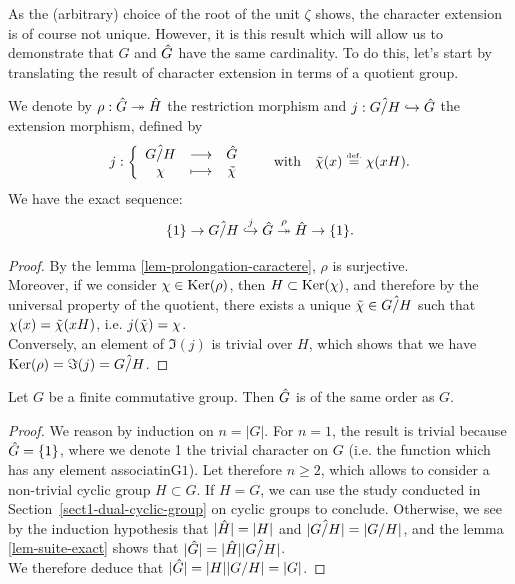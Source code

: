 As the (arbitrary) choice of the root  of the unit $\zeta$ shows, the character extension is of course not unique. However, it is this result which will allow us to demonstrate that $G$ and $\hat{G}$ have the same cardinality. To do this, let's start by translating the result of character extension in terms of a quotient group.

\begin{lem}
\label{lem-suite-exact}
   We denote by $\rho: \hat{G} \twoheadrightarrow \hat{H}$ the restriction morphism and $ j : \hat{G/H} \hookrightarrow \hat{G}$ the extension morphism, defined by
\begin{equation*}
j: {\left\{ \begin{array}{ccc} \hat{G/H} & \longrightarrow & \hat{G} \\ \chi & \longmapsto & \tilde{\chi} \end{array} \right.} \quad \quad \text{with} \quad \tilde{\chi} ( x) \stackrel{\mbox{\upshape\tiny def.}}{=} \chi(x H).
\end{equation*}
We have the exact sequence:
\begin{equation*}
\{1\} \rightarrow \hat{G/H} \overset{j}{\hookrightarrow} \hat{G} \overset{\rho}{\twoheadrightarrow} \hat{H} \rightarrow \{1\} .
\end{equation*}
\end{lem}
\begin{proof}
By the lemma \ref{lem-prolongation-caractere}, $\rho$ is surjective. \\Moreover, if we consider $\chi \in \operatorname{Ker}(\rho)$, then $ H \subset \operatorname{Ker}(\chi)$, and therefore by the universal property of the quotient, there exists a unique $\tilde{\chi} \in \hat{G/H}$ such that $\chi(x) = \tilde{\chi} (x H)$, i.e. $ j(\tilde{\chi}) = \chi$. \\Conversely, an element of $\Im(j)$ is trivial over $H$, which shows that we have $\operatorname{Ker}(\rho) = \Im(j) = \hat{G/H}$.
\end{proof}


\begin{cor}
\label{cor-order-dual-equal-order-group}
 Let $G$ be a finite commutative group. Then $\hat{G}$ is of the same order as $G$.
\end{cor}
\begin{proof}
We reason by induction on $n = |G|$. For $n = 1$, the result is trivial because $\hat{G} = \{1\}$, where we denote 1 the trivial character on $G$ (i.e. the function which has any element associatinG$ 1$). Let therefore $n \geq 2 $, which allows to consider a non-trivial cyclic group $ H \subset G$. If $ H = G$, we can use the study conducted in Section~\ref{sect1-dual-cyclic-group} on cyclic groups to conclude. Otherwise, we see by the induction hypothesis that $|\hat{H}| = |H|$ and $|\hat{G/H}| = | G/H |$, and the lemma \ref{lem-suite-exact} shows that $|\hat{G}| = |\hat{H}| |\hat{G/H}|$. \\We therefore deduce that $|\hat{G}| = |H| | G/H | = |G|$.
\end{proof}

